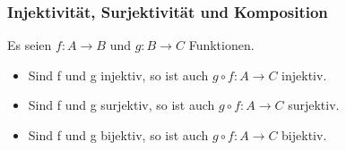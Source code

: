 \subsubsection{Injektivität, Surjektivität und Komposition}
Es seien $f: A \rightarrow B$ und $g: B \rightarrow C$ Funktionen.
\begin{itemize}
    \item Sind f und g injektiv, so ist auch $g \circ f : A \rightarrow C$ injektiv.
    \item Sind f und g surjektiv, so ist auch $g \circ f : A \rightarrow C$ surjektiv.
    \item Sind f und g bijektiv, so ist auch $g \circ f : A \rightarrow C$ bijektiv.
\end{itemize}